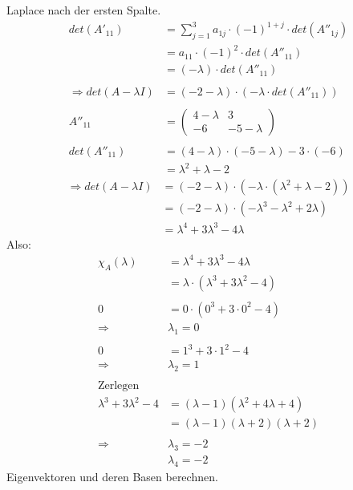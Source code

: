 \documentclass{article} %
\begin{document}
Laplace nach der ersten Spalte. 
\begin{align*}
    det(A'_{11}) & =  \sum^3_{j=1} a_{1j} \cdot (-1)^{1+j} \cdot det(A''_{1j}) \\
    & = a_{11} \cdot (-1)^{2} \cdot det(A''_{11}) \\
     & = (-\lambda) \cdot det(A''_{11}) \\ \\
     \Rightarrow  det( A - \lambda I) &  =(-2-\lambda) \cdot  (-\lambda \cdot det(A''_{11}) )  \\ \\
     A''_{11} & =  \begin{pmatrix}
     4 - \lambda  & 3 \\
      -6 & -5 - \lambda
    \end{pmatrix} \\ \\
    det ( A''_{11}) & = (4-\lambda) \cdot (-5-\lambda) -  3 \cdot (-6) \\
    & = \lambda^2 + \lambda - 2 
\end{align*}
\begin{align*}
      \Rightarrow  det( A - \lambda I) &  =(-2-\lambda) \cdot  (-\lambda \cdot (\lambda^2 + \lambda - 2 ) )  \\ 
     &  =(-2-\lambda) \cdot  (-\lambda^3 - \lambda^2 + 2 \lambda ) \\
     & = \lambda^4 + 3\lambda^3 - 4 \lambda 
\end{align*}
Also: 
 \begin{align*}
 \chi_A(\lambda) &  = \lambda^4 + 3\lambda^3 - 4 \lambda  \\
 & = \lambda \cdot  (\lambda^3 + 3\lambda^2 - 4)  \\  \\ 
  0 &    = 0 \cdot  (0^3 + 3 \cdot 0^2 - 4) \\
  \Rightarrow & \lambda_1 = 0 \\ \\
  0 & = 1^3 + 3\cdot 1^2 - 4 \\ 
  \Rightarrow & \lambda_2 = 1 \\ \\
  \text{Zerlegen} \\ 
  \lambda^3 + 3\lambda^2 - 4  & = (\lambda - 1) (\lambda^2 + 4 \lambda + 4)  \\
  & = (\lambda - 1) (\lambda + 2) (\lambda + 2) \\ \\
  \Rightarrow & \lambda_3 = -2 \\
  & \lambda_4 = -2
 \end{align*}
Eigenvektoren und deren Basen berechnen.   
\end{document}
